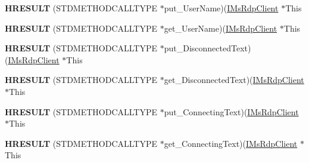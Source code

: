 \begin{DoxyCompactItemize}
\item 
\mbox{\label{struct_m_s_t_s_c_lib_1_1_i_ms_rdp_client_vtbl_a76a74ff6f515e010fadf3adb2206debc}} 
{\bfseries H\+R\+E\+S\+U\+LT} (S\+T\+D\+M\+E\+T\+H\+O\+D\+C\+A\+L\+L\+T\+Y\+PE $\ast$put\+\_\+\+User\+Name)(\hyperlink{interface_m_s_t_s_c_lib_1_1_i_ms_rdp_client}{I\+Ms\+Rdp\+Client} $\ast$This
\item 
\mbox{\label{struct_m_s_t_s_c_lib_1_1_i_ms_rdp_client_vtbl_a621e7e9455ffedd5cb25b418750dc6aa}} 
{\bfseries H\+R\+E\+S\+U\+LT} (S\+T\+D\+M\+E\+T\+H\+O\+D\+C\+A\+L\+L\+T\+Y\+PE $\ast$get\+\_\+\+User\+Name)(\hyperlink{interface_m_s_t_s_c_lib_1_1_i_ms_rdp_client}{I\+Ms\+Rdp\+Client} $\ast$This
\item 
\mbox{\label{struct_m_s_t_s_c_lib_1_1_i_ms_rdp_client_vtbl_a9e90063540348b56520846c5c0b33104}} 
{\bfseries H\+R\+E\+S\+U\+LT} (S\+T\+D\+M\+E\+T\+H\+O\+D\+C\+A\+L\+L\+T\+Y\+PE $\ast$put\+\_\+\+Disconnected\+Text)(\hyperlink{interface_m_s_t_s_c_lib_1_1_i_ms_rdp_client}{I\+Ms\+Rdp\+Client} $\ast$This
\item 
\mbox{\label{struct_m_s_t_s_c_lib_1_1_i_ms_rdp_client_vtbl_a5b459bb933113639c3a02a9e5cd347c1}} 
{\bfseries H\+R\+E\+S\+U\+LT} (S\+T\+D\+M\+E\+T\+H\+O\+D\+C\+A\+L\+L\+T\+Y\+PE $\ast$get\+\_\+\+Disconnected\+Text)(\hyperlink{interface_m_s_t_s_c_lib_1_1_i_ms_rdp_client}{I\+Ms\+Rdp\+Client} $\ast$This
\item 
\mbox{\label{struct_m_s_t_s_c_lib_1_1_i_ms_rdp_client_vtbl_a1deb7408424ad82fc4dfcba6030e5da6}} 
{\bfseries H\+R\+E\+S\+U\+LT} (S\+T\+D\+M\+E\+T\+H\+O\+D\+C\+A\+L\+L\+T\+Y\+PE $\ast$put\+\_\+\+Connecting\+Text)(\hyperlink{interface_m_s_t_s_c_lib_1_1_i_ms_rdp_client}{I\+Ms\+Rdp\+Client} $\ast$This
\item 
\mbox{\label{struct_m_s_t_s_c_lib_1_1_i_ms_rdp_client_vtbl_a380b2b49ef85b074b644a26592fb03a9}} 
{\bfseries H\+R\+E\+S\+U\+LT} (S\+T\+D\+M\+E\+T\+H\+O\+D\+C\+A\+L\+L\+T\+Y\+PE $\ast$get\+\_\+\+Connecting\+Text)(\hyperlink{interface_m_s_t_s_c_lib_1_1_i_ms_rdp_client}{I\+Ms\+Rdp\+Client} $\ast$This

\end{DoxyCompactItemize}

